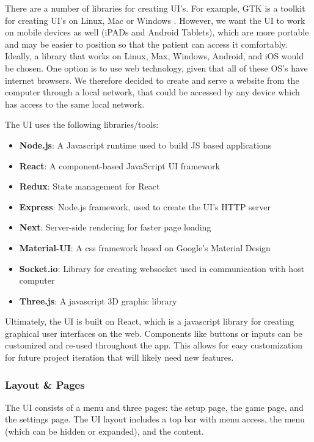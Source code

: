 \documentclass[12pt]{report}
\begin{document}
	There are a number of libraries for creating UI's. For example, GTK is a toolkit for creating UI's on Linux, Mac or Windows \cite{TheGTKTeam2019}. However, we want the UI to work on mobile devices as well (iPADs and Android Tablets), which are more portable and may be easier to position so that the patient can access it comfortably. Ideally, a library that works on Linux, Max, Windows, Android, and iOS would be chosen. One option is to use web technology, given that all of these OS's have internet browsers. We therefore decided to create and serve a website from the computer through a local network, that could be accessed by any device which has access to the same local network. 
	
	The UI uses the following libraries/tools:
	
	\begin{itemize}
		\item \textbf{Node.js}: A Javascript runtime used to build JS based applications 		
		\item \textbf{React}: A component-based JavaScript UI framework
		\item \textbf{Redux}: State management for React
		\item \textbf{Express}: Node.js framework, used to create the UI's HTTP server
		\item \textbf{Next}: Server-side rendering for faster page loading
		\item \textbf{Material-UI}: A css framework based on Google's Material Design
		\item \textbf{Socket.io}: Library for creating websocket used in communication with host computer
		\item \textbf{Three.js}: A javascript 3D graphic library 
	\end{itemize}
	
	
	Ultimately, the UI is built on React, which is a javascript library for creating graphical user interfaces on the web. Components like buttons or inputs can be customized and re-used throughout the app. This allows for easy customization for future project iteration that will likely need new features. 
	
		\subsubsection{Layout \& Pages}

The UI consists of a menu and three pages: the setup page, the game page, and the settings page. The UI layout includes a top bar with menu access, the menu (which can be hidden or expanded), and the content. 
\end{document}
